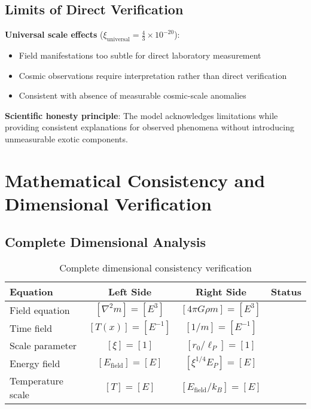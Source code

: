 \documentclass[12pt,a4paper]{article}
\newcommand{\Tfield}{T(x)}
\begin{document}
	\subsection{Limits of Direct Verification}
	\label{subsec:verification_limits}
	
	\textbf{Universal scale effects} ($\xi_{\text{universal}} = \frac{4}{3} \times 10^{-20}$):
	\begin{itemize}
		\item Field manifestations too subtle for direct laboratory measurement
		\item Cosmic observations require interpretation rather than direct verification
		\item Consistent with absence of measurable cosmic-scale anomalies
	\end{itemize}
	
	\textbf{Scientific honesty principle}:
	The model acknowledges limitations while providing consistent explanations for observed phenomena without introducing unmeasurable exotic components.
	
	\section{Mathematical Consistency and Dimensional Verification}
	\label{sec:consistency_verification}
	
	\subsection{Complete Dimensional Analysis}
	\label{subsec:dimensional_analysis}
	
	\begin{table}[htbp]
		\centering
		\begin{tabular}{|l|c|c|c|}
			\hline
			\textbf{Equation} & \textbf{Left Side} & \textbf{Right Side} & \textbf{Status} \\
			\hline
			Field equation & $[\nabla^2 m] = [E^3]$ & $[4\pi G \rho m] = [E^3]$ & \checkmark \\
			Time field & $[\Tfield] = [E^{-1}]$ & $[1/m] = [E^{-1}]$ & \checkmark \\
			Scale parameter & $[\xi] = [1]$ & $[r_0/\ell_P] = [1]$ & \checkmark \\
			Energy field & $[E_{\text{field}}] = [E]$ & $[\xi^{1/4} E_P] = [E]$ & \checkmark \\
			Temperature scale & $[T] = [E]$ & $[E_{\text{field}}/k_B] = [E]$ & \checkmark \\
			\hline
		\end{tabular}
		\caption{Complete dimensional consistency verification}
		\label{tab:dim_analysis}
	\end{table}
	
\end{document}
